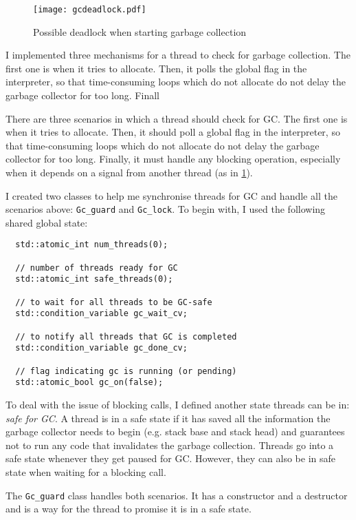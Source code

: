 \begin{figure}[H]
  \centering
  \texttt{[image: gcdeadlock.pdf]}
  \caption{Possible deadlock when starting garbage collection}
  \label{fig:gcdeadlock}
\end{figure}

I implemented three mechanisms
for a thread to check for garbage collection. The first one is when it tries to allocate. Then, it
polls the global flag in the interpreter, so that time-consuming loops which do not allocate do not
delay the garbage collector for too long. Finall

There are three scenarios in which a thread should check for GC. The first one is when it tries to allocate.
Then, it should poll a global flag in the interpreter, so that time-consuming loops which do not allocate do not
delay the garbage collector for too long. Finally, it must handle any blocking operation, especially
when it depends on a signal from another thread (as in \ref{fig:gcdeadlock}).

I created two classes to help me synchronise threads for GC and handle all the scenarios above:
\verb|Gc_guard| and \verb|Gc_lock|.
To begin with, I used the following shared global state:
\begin{code}
\begin{verbatim}
  std::atomic_int num_threads(0);

  // number of threads ready for GC
  std::atomic_int safe_threads(0);

  // to wait for all threads to be GC-safe
  std::condition_variable gc_wait_cv;

  // to notify all threads that GC is completed
  std::condition_variable gc_done_cv;

  // flag indicating gc is running (or pending)
  std::atomic_bool gc_on(false);
\end{verbatim}
\end{code}

To deal with the issue of blocking calls, I defined another state threads can be in: \emph{safe for GC}. A thread
is in a safe state if it has saved all the information the garbage collector needs to begin (e.g. stack base
and stack head) and guarantees not to run any code that invalidates the garbage collection. Threads go into a safe
state whenever they get paused for GC. However, they can also be in safe state when waiting for a blocking call.

The \verb|Gc_guard| class handles both scenarios.
It has a constructor and a destructor and is a way for the thread to promise it is in a safe state.


